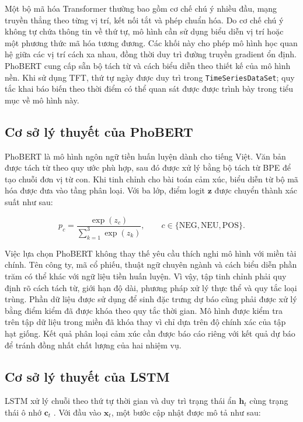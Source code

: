 \documentclass[12pt, a4paper, oneside]{report}
\begin{document}
Một bộ mã hóa Transformer thường bao gồm cơ chế chú ý nhiều đầu, mạng truyền thẳng theo
từng vị trí, kết nối tắt và phép chuẩn hóa. Do cơ chế chú ý không tự chứa thông tin về
thứ tự, mô hình cần sử dụng biểu diễn vị trí hoặc một phương thức mã hóa tương đương.
Các khối này cho phép mô hình học quan hệ giữa các vị trí cách xa nhau, đồng thời duy
trì đường truyền gradient ổn định. PhoBERT cung cấp sẵn bộ tách từ và cách biểu diễn
theo thiết kế của mô hình nền. Khi sử dụng TFT, thứ tự ngày được duy trì trong
\texttt{TimeSeriesDataSet}; quy tắc khai báo biến theo thời điểm có thể quan sát được
được trình bày trong tiểu mục về mô hình này.

\subsection{Cơ sở lý thuyết của PhoBERT}

PhoBERT là mô hình ngôn ngữ tiền huấn luyện dành cho tiếng Việt. Văn bản được tách từ
theo quy ước phù hợp, sau đó được xử lý bằng bộ tách từ BPE để tạo chuỗi đơn vị từ con.
Khi tinh chỉnh cho bài toán cảm xúc, biểu diễn từ bộ mã hóa được đưa vào tầng phân
loại. Với ba lớp, điểm logit $\mathbf{z}$ được chuyển thành xác suất như sau:

\begin{equation}
  p_c=\frac{\exp(z_c)}{\sum_{k=1}^{3}\exp(z_k)},
  \qquad c\in\{\mathrm{NEG},\mathrm{NEU},\mathrm{POS}\}.
  \label{eq:sentiment-softmax}
\end{equation}

Việc lựa chọn PhoBERT không thay thế yêu cầu thích nghi mô hình với miền tài chính.
Tên công ty, mã cổ phiếu, thuật ngữ chuyên ngành và cách biểu diễn phần trăm có thể
khác với ngữ liệu tiền huấn luyện. Vì vậy, tập tinh chỉnh phải quy định rõ cách tách
từ, giới hạn độ dài, phương pháp xử lý thực thể và quy tắc loại trùng. Phần dữ liệu
được sử dụng để sinh đặc trưng dự báo cũng phải được xử lý bằng điểm kiểm đã được khóa
theo quy tắc thời gian. Mô hình được kiểm tra trên tập dữ liệu trong miền đã khóa thay
vì chỉ dựa trên độ chính xác của tập hạt giống. Kết quả phân loại cảm xúc cần được báo
cáo riêng với kết quả dự báo để tránh đồng nhất chất lượng của hai nhiệm vụ.

\subsection{Cơ sở lý thuyết của LSTM}

LSTM xử lý chuỗi theo thứ tự thời gian và duy trì trạng thái ẩn $\mathbf{h}_t$ cùng
trạng thái ô nhớ $\mathbf{c}_t$ \cite{Hochreiter1997_lstm}. Với đầu vào
$\mathbf{x}_t$, một bước cập nhật được mô tả như sau:
\end{document}
